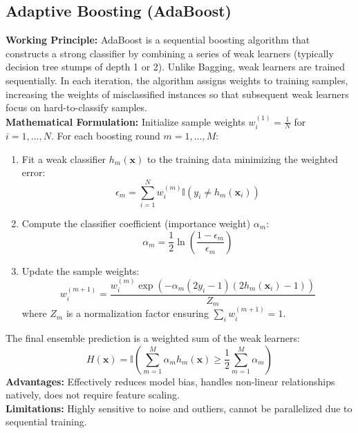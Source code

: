 \documentclass[12pt,a4paper]{article}
\begin{document}
\subsection{Adaptive Boosting (AdaBoost)}
\textbf{Working Principle:} AdaBoost is a sequential boosting algorithm that constructs a strong classifier by combining a series of weak learners (typically decision tree stumps of depth 1 or 2). Unlike Bagging, weak learners are trained sequentially. In each iteration, the algorithm assigns weights to training samples, increasing the weights of misclassified instances so that subsequent weak learners focus on hard-to-classify samples.\\
\textbf{Mathematical Formulation:}
Initialize sample weights $w_i^{(1)} = \frac{1}{N}$ for $i=1, \dots, N$. For each boosting round $m = 1, \dots, M$:
\begin{enumerate}
    \item Fit a weak classifier $h_m(\mathbf{x})$ to the training data minimizing the weighted error:
    \begin{equation}
    \epsilon_m = \sum_{i=1}^N w_i^{(m)} \mathbb{I}(y_i \neq h_m(\mathbf{x}_i))
    \end{equation}
    \item Compute the classifier coefficient (importance weight) $\alpha_m$:
    \begin{equation}
    \alpha_m = \frac{1}{2} \ln \left( \frac{1 - \epsilon_m}{\epsilon_m} \right)
    \end{equation}
    \item Update the sample weights:
    \begin{equation}
    w_i^{(m+1)} = \frac{w_i^{(m)} \exp \left( -\alpha_m (2y_i - 1)(2h_m(\mathbf{x}_i) - 1) \right)}{Z_m}
    \end{equation}
    where $Z_m$ is a normalization factor ensuring $\sum_i w_i^{(m+1)} = 1$.
\end{enumerate}
The final ensemble prediction is a weighted sum of the weak learners:
\begin{equation}
H(\mathbf{x}) = \mathbb{I} \left( \sum_{m=1}^M \alpha_m h_m(\mathbf{x}) \ge \frac{1}{2} \sum_{m=1}^M \alpha_m \right)
\end{equation}
\textbf{Advantages:} Effectively reduces model bias, handles non-linear relationships natively, does not require feature scaling.\\
\textbf{Limitations:} Highly sensitive to noise and outliers, cannot be parallelized due to sequential training.
\end{document}

